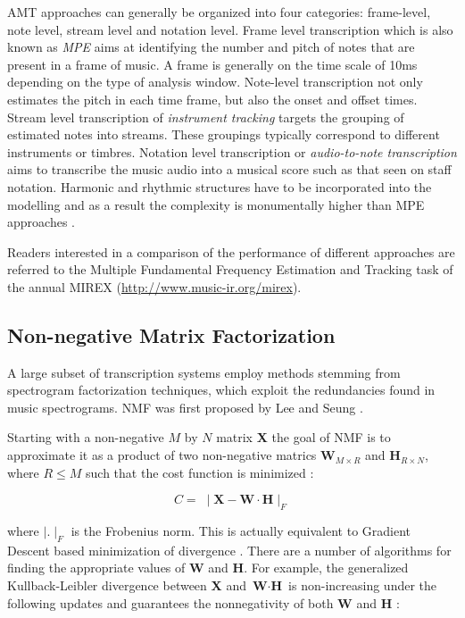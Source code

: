 \ac{AMT} approaches can generally be organized into four categories: frame-level,
note level, stream level and notation level. Frame level transcription which is
also known as \emph{\ac{MPE}} aims at identifying the number and
pitch of notes that are present in a frame of music. A frame is generally on the
time scale of 10ms depending on the type of analysis window. Note-level
transcription not only estimates the pitch in each time frame, but also the onset
and offset times. Stream level transcription of \emph{instrument tracking}
targets the grouping of estimated notes into streams. These groupings typically
correspond to different instruments or timbres. Notation level transcription or
\emph{audio-to-note transcription} aims to transcribe the music audio into a
musical score such as that seen on staff notation. Harmonic and rhythmic
structures have to be incorporated into the modelling and as a result the
complexity is monumentally higher than \ac{MPE} approaches \cite{MIR-recent-dev:Schedl}.

Readers interested in a comparison of the performance of different approaches
are referred to the Multiple Fundamental Frequency Estimation and Tracking task
of the annual \ac{MIREX}
(\url{http://www.music-ir.org/mirex}).


\subsection{Non-negative Matrix Factorization}

A large subset of transcription systems employ methods stemming from spectrogram
factorization techniques, which exploit the redundancies found in music
spectrograms. \ac{NMF} was first proposed by Lee and Seung \cite{nmf1999:Seung}.

Starting with a non-negative $M$ by $N$ matrix \textbf{X} the goal of \ac{NMF} is to
approximate it as a product of two non-negative matrics $ \textbf{W}_{M \times
    R}$ and $\textbf{H}_{R \times N}$, where $R \leq M$ such that the cost function is
minimized :

\begin{equation}
  C = \;\mid \textbf{X} - \textbf{W}\cdot \textbf{H} \mid _ {F}
\end{equation}

where $\mid . \mid_{F}$ is the Frobenius norm. This is actually equivalent to
Gradient Descent based minimization of divergence \cite{nmfamt2003:Smaragdis}.
There are a number of algorithms for finding the appropriate values of
\textbf{W} and \textbf{H}. For example, the generalized Kullback-Leibler
divergence between \textbf{X} and $\textbf{W}\cdot \textbf{H}$ is non-increasing
under the following updates and guarantees the nonnegativity of both \textbf{W}
and \textbf{H} :

